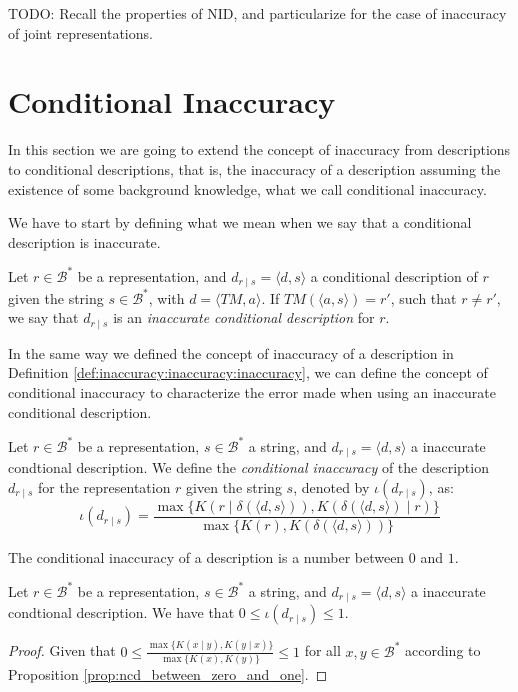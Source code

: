 {\color{red} TODO: Recall the properties of NID, and particularize for the case of inaccuracy of joint representations.}

%
%

\section{Conditional Inaccuracy}

In this section we are going to extend the concept of inaccuracy from descriptions to conditional descriptions, that is, the inaccuracy of a description assuming the existence of some background knowledge, what we call conditional inaccuracy.

We have to start by defining what we mean when we say that a conditional description is inaccurate.

\begin{definition}
Let $r \in \mathcal{B}^\ast$ be a representation, and $d_{r \mid s} = \langle d, s \rangle$ a conditional description of $r$ given the string $s \in \mathcal{B}^\ast$, with $ d = \langle TM, a \rangle$. If $TM \left(\langle a, s \rangle \right) = r'$, such that $r \neq r'$, we say that $d_{r \mid s}$ is an \emph{inaccurate conditional description} for $r$.
\end{definition}

In the same way we defined the concept of inaccuracy of a description in Definition \ref{def:inaccuracy:inaccuracy:inaccuracy}, we can define the concept of conditional inaccuracy to characterize the error made when using an inaccurate conditional description.

\begin{definition}
Let $r \in \mathcal{B}^\ast$ be a representation, $s \in \mathcal{B}^\ast$ a string, and $d_{r \mid s} = \langle d, s \rangle$ a inaccurate condtional description. We define the \emph{conditional inaccuracy} of the description $d_{r \mid s}$ for the representation $r$ given the string $s$, denoted by $\iota(d_{r \mid s})$, as:
\[
\iota(d_{r \mid s}) = \frac{ \max\{ K \left(r \mid \delta(\langle d, s \rangle) \right), K \left( \delta(\langle d, s \rangle) \mid r \right) \} } { \max\{ K(r), K \left(\delta(\langle d, s \rangle) \right) \} }
\]
\end{definition}

The conditional inaccuracy of a description is a number between $0$ and $1$.

\begin{proposition}
\label{prop:range_conditional_inaccuracy}
Let $r \in \mathcal{B}^\ast$ be a representation, $s \in \mathcal{B}^\ast$ a string, and $d_{r \mid s} = \langle d, s \rangle$ a inaccurate condtional description. We have that $0 \leq \iota(d_{r \mid s}) \leq 1$.
\end{proposition}
\begin{proof}
Given that $0 \leq \frac{ \max\{ K(x \mid y), K(y \mid x) \} } { \max\{ K(x), K(y) \} } \leq 1$ for all $x, y \in \mathcal{B}^\ast$ according to Proposition \ref{prop:ncd_between_zero_and_one}.
\end{proof}

